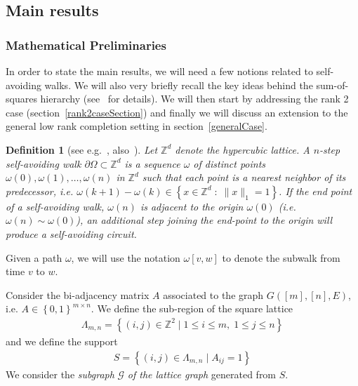 \documentclass[12pt]{article}
\newtheorem{definition}{Definition}
\begin{document}
\subsection{Main results}


\subsubsection{Mathematical Preliminaries}

In order to state the main results, we will need a few notions related to self-avoiding walks. We will also very briefly recall the key ideas behind the sum-of-squares hierarchy (see~\cite{laurent2008sums} for details). We will then start by addressing the rank 2 case (section~\ref{rank2caseSection}) and finally we will discuss an extension to the general low rank completion setting in section~\ref{generalCase}. 

\begin{definition}[see e.g.~\cite{polypoly2009, tullekenpolyominoes2}, also~\cite{van2015statistical}]
Let $\mathbb{Z}^d$ denote the hypercubic lattice.  A $n$-step self-avoiding walk $\partial\Omega\subset \mathbb{Z}^d$ is a sequence $\omega$ of distinct points $\omega(0), \omega(1), \ldots, \omega(n)$ in $\mathbb{Z}^d$ such that each point is a nearest neighbor of its predecessor, i.e. $\omega(k+1) - \omega(k)\in \left\{x\in \mathbb{Z}^d\;:\; \|x\|_1 = 1\right\}$.  If the end point of a self-avoiding walk, $\omega(n)$ is adjacent to the origin $\omega(0)$ (i.e. $\omega(n)\sim\omega(0)$), an additional step joining the end-point to the origin will produce a \emph{self-avoiding circuit}.
\end{definition}

Given a path $\omega$, we will use the notation $\omega[v, w]$ to denote the subwalk from time $v$ to $w$. 

Consider the bi-adjacency matrix $A$ associated to the graph $G([m],[n], E)$, i.e. $A\in \left\{0,1\right\}^{m\times n}$.  We define the sub-region of the square lattice
\begin{align}
\Lambda_{m,n} = \left\{(i,j)\in \mathbb{Z}^2\;|\; 1\leq i\leq m, \;1\leq j\leq n\right\}
\end{align}
and we define the support 
\begin{align}
S = \left\{(i,j)\in \Lambda_{m,n}\; |\; A_{ij}=1\right\}
\end{align}
We consider the \emph{subgraph} $\mathcal{G}$  \emph{of the lattice graph} generated from $S$.
\end{document}
